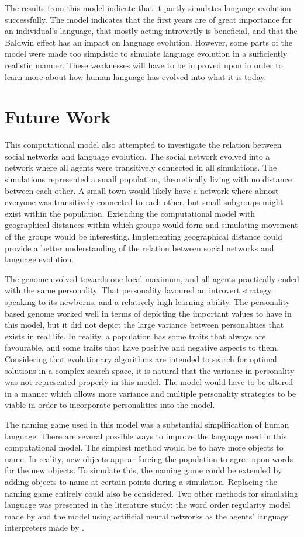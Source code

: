 The results from this model indicate that it partly simulates language evolution successfully. The model indicates that the first years are of great importance for an individual's language, that mostly acting introvertly is beneficial, and that the Baldwin effect has an impact on language evolution. However, some parts of the model were made too simplistic to simulate language evolution in a sufficiently realistic manner. These weaknesses will have to be improved upon in order to learn more about how human language has evolved into what it is today.
\section{Future Work}
This computational model also attempted to investigate the relation between social networks and language evolution. The social network evolved into a network where all agents were transitively connected in all simulations. The simulations represented a small population, theoretically living with no distance between each other. A small town would likely have a network where almost everyone was transitively connected to each other, but small subgroups might exist within the population. Extending the computational model with geographical distances within which groups would form and simulating movement of the groups would be interesting. Implementing geographical distance could provide a better understanding of the relation between social networks and language evolution.
 
The genome evolved towards one local maximum, and all agents practically ended with the same personality. That personality favoured an introvert strategy, speaking to its newborns, and a relatively high learning ability. The personality based genome worked well in terms of depicting the important values to have in this model, but it did not depict the large variance between personalities that exists in real life. In reality, a population has some traits that always are favourable, and some traits that have positive and negative aspects to them. Considering that evolutionary algorithms are intended to search for optimal solutions in a complex search space, it is natural that the variance in personality was not represented properly in this model. The model would have to be altered in a manner which allows more variance and multiple personality strategies to be viable in order to incorporate personalities into the model.  
 
The naming game used in this model was a substantial simplification of human language. There are several possible ways to improve the language used in this computational model. The simplest method would be to have more objects to name. In reality, new objects appear forcing the population to agree upon words for the new objects. To simulate this, the naming game could be extended by adding objects to name at certain points during a simulation. Replacing the naming game entirely could also be considered. Two other methods for simulating language was presented in the literature study: the word order regularity model made by \citet{gong2004computational} and the model using artificial neural networks as the agents’ language interpreters made by \citet{munroe2002learning}.
